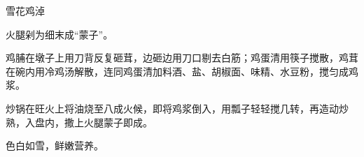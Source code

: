 \begin{recipe}{雪花鸡淖}

\ingredients


\preparation

\step 火腿剁为细末成“蒙子”。

\step 鸡脯在墩子上用刀背反复砸茸，边砸边用刀口剔去白筋；鸡蛋清用筷子搅散，鸡茸
在碗内用冷鸡汤解散，连同鸡蛋清加料酒、盐、胡椒面、味精、水豆粉，搅匀成鸡浆。

\step 炒锅在旺火上将油烧至八成火候，即将鸡浆倒入，用瓢子轻轻搅几转，再造动炒
熟，入盘内，撒上火腿蒙子即成。

\features

色白如雪，鲜嫩营养。

\end{recipe}

